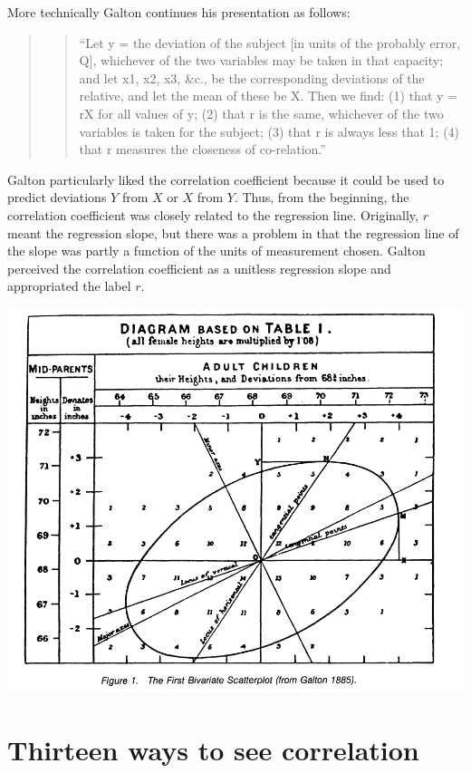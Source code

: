 \documentclass[
]{report}
\begin{document}
More technically Galton continues his presentation as follows:

\begin{quote}
\begin{quote}
``Let y = the deviation of the subject {[}in units of the probably error, Q{]}, whichever of the two variables may be taken in that capacity; and let x1, x2, x3, \&c., be the corresponding deviations of the relative, and let the mean of these be X. Then we find: (1) that y = rX for all values of y; (2) that r is the same, whichever of the two variables is taken for the subject; (3) that r is always less that 1; (4) that r measures the closeness of co-relation.''
\end{quote}
\end{quote}

Galton particularly liked the correlation coefficient because it could be used to predict deviations \(Y\) from \(X\) or \(X\) from \(Y\). Thus, from the beginning, the correlation coefficient was closely related to the regression line. Originally, \(r\) meant the regression slope, but there was a problem in that the regression line of the slope was partly a function of the units of measurement chosen. Galton perceived the correlation coefficient as a unitless regression slope and appropriated the label \(r\).

\includegraphics[width=13.28in]{galton}

\hypertarget{thirteen-ways-to-see-correlation-13cor}{%
\section{\texorpdfstring{Thirteen ways to see correlation \citep{13cor}}{Thirteen ways to see correlation {[}@13cor{]}}}\label{thirteen-ways-to-see-correlation-13cor}}
\end{document}
